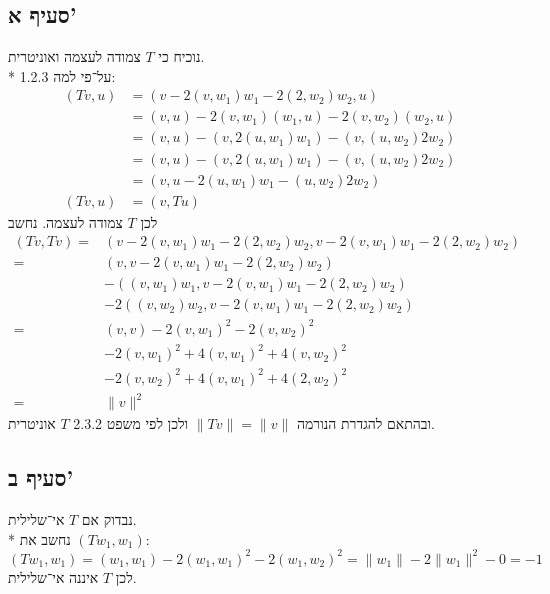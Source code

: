 \subsection{סעיף א'}
נוכיח כי $T$ צמודה לעצמה ואוניטרית. \\*
על־פי למה 1.2.3:
\begin{align*}
	(T v, u)
	& = (v - 2(v, w_1) w_1 - 2(2, w_2) w_2, u) \\
	& = (v, u) - 2 (v, w_1) (w_1, u) - 2(v, w_2) (w_2, u) \\
	& = (v, u) - (v, 2 (u, w_1) w_1) - (v, (u, w_2) 2w_2) \\
	& = (v, u) - (v, 2 (u, w_1) w_1) - (v, (u, w_2) 2w_2) \\
	& = (v, u - 2 (u, w_1) w_1 - (u, w_2) 2w_2) \\
	(T v, u) & = (v, T u)
\end{align*}
לכן $T$ צמודה לעצמה. \*
נחשב
\begin{align*}
	(T v, T v)
	= & (v - 2(v, w_1) w_1 - 2(2, w_2) w_2, v - 2(v, w_1) w_1 - 2(2, w_2) w_2) \\
	= & (v, v - 2(v, w_1) w_1 - 2(2, w_2) w_2) \\
	& - ((v, w_1) w_1, v - 2(v, w_1) w_1 - 2(2, w_2) w_2) \\
	& - 2((v, w_2) w_2, v - 2(v, w_1) w_1 - 2(2, w_2) w_2) \\
	= & (v, v) - 2 (v, w_1)^2 - 2(v, w_2)^2 \\
	& - 2(v, w_1)^2 + 4(v, w_1)^2  + 4(v, w_2)^2 \\
	& - 2(v, w_2)^2 + 4(v, w_1)^2 + 4(2, w_2)^2 \\
	= & \lVert v\rVert^2
\end{align*}
ובהתאם להגדרת הנורמה $\lVert T v \rVert = \lVert v \rVert$ ולכן לפי משפט 2.3.2 $T$ אוניטרית.

\subsection{סעיף ב'}
נבדוק אם $T$ אי־שלילית. \\*
נחשב את $(T w_1, w_1)$:
\[
	(T w_1, w_1)
	= (w_1, w_1) - 2 (w_1, w_1)^2 - 2(w_1, w_2)^2
	= \lVert w_1 \rVert - 2\lVert w_1 \rVert^2 - 0
	= -1
\]
לכן $T$ איננה אי־שלילית.



